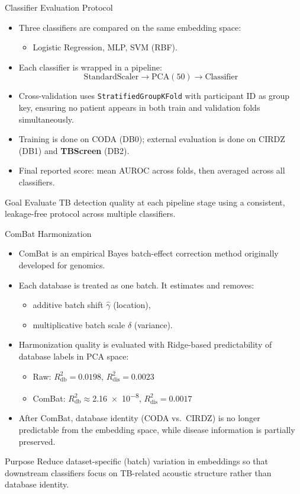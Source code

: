 \documentclass[aspectratio=169]{beamer}
\begin{document}
\begin{frame}{Classifier Evaluation Protocol}
\begin{itemize}
  \item Three classifiers are compared on the same embedding space:
  \begin{itemize}
    \item Logistic Regression, MLP, SVM (RBF).
  \end{itemize}
  \item Each classifier is wrapped in a pipeline:
  \[
    \text{StandardScaler} \rightarrow \text{PCA}(50) \rightarrow \text{Classifier}
  \]
  \item Cross-validation uses \texttt{StratifiedGroupKFold} with participant ID as group key,
        ensuring no patient appears in both train and validation folds simultaneously.
  \item Training is done on CODA (DB0); external evaluation is done on CIRDZ (DB1) and \textbf{TBScreen} (DB2).
  \item Final reported score: mean AUROC across folds, then averaged across all classifiers.
\end{itemize}
\begin{block}{Goal}
  Evaluate TB detection quality at each pipeline stage using a consistent, leakage-free protocol across multiple classifiers.
\end{block}
\end{frame}

\begin{frame}{ComBat Harmonization}
\begin{itemize}
  \item ComBat is an empirical Bayes batch-effect correction method originally developed for genomics.
  \item Each database is treated as one batch. It estimates and removes:
  \begin{itemize}
    \item additive batch shift $\hat{\gamma}$ (location),
    \item multiplicative batch scale $\hat{\delta}$ (variance).
  \end{itemize}
  \item Harmonization quality is evaluated with Ridge-based predictability of database labels in PCA space:
  \begin{itemize}
    \item Raw: $R^2_{\text{db}} = 0.0198$, $R^2_{\text{dis}} = 0.0023$
    \item ComBat: $R^2_{\text{db}} \approx $\num{2.16e-8}, $R^2_{\text{dis}} = 0.0017$
  \end{itemize}
  \item After ComBat, database identity (CODA vs.\ CIRDZ) is no longer predictable from the embedding space, while disease information is partially preserved.
\end{itemize}
\begin{block}{Purpose}
  Reduce dataset-specific (batch) variation in embeddings so that downstream classifiers focus on TB-related acoustic structure rather than database identity.
\end{block}
\end{frame}
\end{document}
